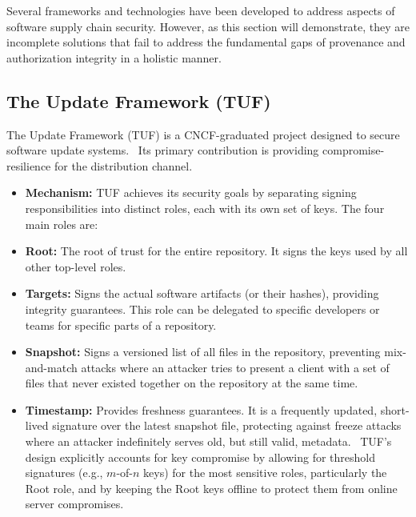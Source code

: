 \documentclass{article}
\begin{document}
Several frameworks and technologies have been developed to address aspects of software supply chain security. However, as this section will demonstrate, they are incomplete solutions that fail to address the fundamental gaps of provenance and authorization integrity in a holistic manner.

\subsection{The Update Framework (TUF)}

The Update Framework (TUF) is a CNCF-graduated project designed to secure software update systems.~\cite{samuel2010tuf} Its primary contribution is providing compromise-resilience for the distribution channel.

\begin{itemize}
\item \textbf{Mechanism:} TUF achieves its security goals by separating signing responsibilities into distinct roles, each with its own set of keys. The four main roles are:
\end{itemize}

\begin{itemize}
\item \textbf{Root:} The root of trust for the entire repository. It signs the keys used by all other top-level roles.
\item \textbf{Targets:} Signs the actual software artifacts (or their hashes), providing integrity guarantees. This role can be delegated to specific developers or teams for specific parts of a repository.
\item \textbf{Snapshot:} Signs a versioned list of all files in the repository, preventing mix-and-match attacks where an attacker tries to present a client with a set of files that never existed together on the repository at the same time.
\item \textbf{Timestamp:} Provides freshness guarantees. It is a frequently updated, short-lived signature over the latest snapshot file, protecting against freeze attacks where an attacker indefinitely serves old, but still valid, metadata.~\cite{samuel2010tuf} TUF's design explicitly accounts for key compromise by allowing for threshold signatures (e.g., $m$-of-$n$ keys) for the most sensitive roles, particularly the Root role, and by keeping the Root keys offline to protect them from online server compromises.~\cite{kuppusamy2016diplomat}
\end{itemize}
\end{document}
